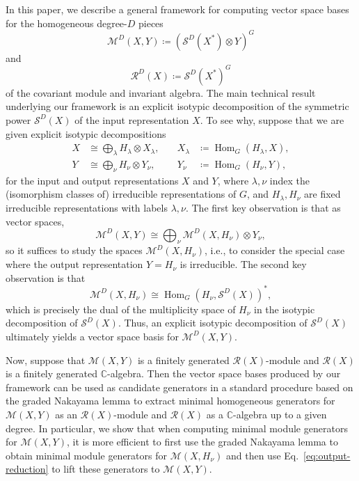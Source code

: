 \documentclass[11pt]{article}
\newcommand{\dsC}{\mathbb{C}}
\newcommand{\scM}{\mathcal{M}}
\newcommand{\scR}{\mathcal{R}}
\newcommand{\scS}{\mathcal{S}}
\newcommand{\HomG}[2]{\operatorname{Hom}_G\!\left(#1,#2\right)}
\theoremstyle{definition}
\begin{document}
In this paper, we describe a general framework for computing vector space bases for the homogeneous degree-$D$ pieces
\[
  \scM^D(X,Y)\coloneq\left(\scS^D(X^*)\otimes Y\right)^G
\]
and
\[
  \scR^D(X)\coloneq\scS^D(X^*)^G
\]
of the covariant module and invariant algebra. The main technical result underlying our framework is an explicit isotypic decomposition of the symmetric power $\scS^D(X)$ of the input representation $X$. To see why, suppose that we are given explicit isotypic decompositions
\[
  \begin{aligned}\label{eq:input-output-isotypic}
    X &\cong \bigoplus_{\lambda} H_\lambda\otimes X_\lambda,
    &\quad
    X_\lambda &\coloneq \HomG{H_\lambda}{X},\\
    Y &\cong \bigoplus_{\nu} H_\nu\otimes Y_\nu,
    &\quad
    Y_\nu &\coloneq \HomG{H_\nu}{Y},
  \end{aligned}
\]
for the input and output representations $X$ and $Y$, where $\lambda, \nu$ index the (isomorphism classes of) irreducible representations of $G$, and $H_\lambda, H_\nu$ are fixed irreducible representations with labels $\lambda, \nu$. The first key observation is that as vector spaces,
\begin{equation}\label{eq:output-reduction}
  \scM^D(X,Y)
  \cong
  \bigoplus_{\nu}
  \scM^D(X,H_\nu)\otimes Y_\nu,
\end{equation}
so it suffices to study the spaces $\scM^D(X,H_\nu)$, i.e., to consider the special case where the output representation $Y = H_\nu$ is irreducible. The second key observation is that
\begin{equation}\label{eq:duality}
  \scM^D(X,H_\nu)
  \cong
  \HomG{H_\nu}{\scS^D(X)}^*,
\end{equation}
which is precisely the dual of the multiplicity space of $H_\nu$ in the isotypic decomposition of $\scS^D(X)$. Thus, an explicit isotypic decomposition of $\scS^D(X)$ ultimately yields a vector space basis for $\scM^D(X,Y)$.

Now, suppose that $\scM(X,Y)$ is a finitely generated $\scR(X)$-module and $\scR(X)$ is a finitely generated $\dsC$-algebra. Then the vector space bases produced by our framework can be used as candidate generators in a standard procedure based on the graded Nakayama lemma to extract minimal homogeneous generators for $\scM(X,Y)$ as an $\scR(X)$-module and $\scR(X)$ as a $\dsC$-algebra up to a given degree. In particular, we show that when computing minimal module generators for $\scM(X,Y)$, it is more efficient to first use the graded Nakayama lemma to obtain minimal module generators for $\scM(X,H_\nu)$ and then use Eq.~\eqref{eq:output-reduction} to lift these generators to $\scM(X,Y)$.
\end{document}
